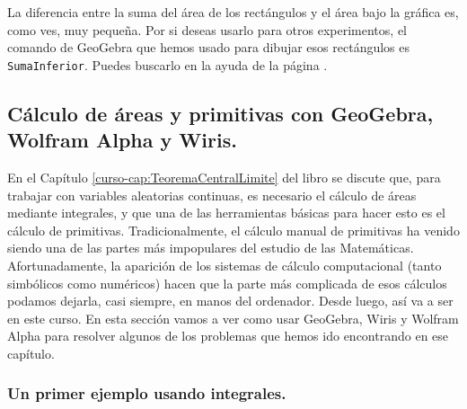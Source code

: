 \documentclass[10pt,a4paper]{article}\usepackage[]{graphicx}\usepackage[]{color}
\newcounter{cont01}
\begin{document}
La diferencia entre la suma del área de los rectángulos y el área bajo la gráfica es, como ves, muy pequeña. Por si deseas usarlo para otros experimentos, el comando de GeoGebra que hemos usado para dibujar esos rectángulos es {\tt SumaInferior}. Puedes buscarlo en la ayuda de la página .

\subsection{Cálculo de áreas y primitivas con GeoGebra, Wolfram Alpha y Wiris.}
\label{tut05:subsec:IntegralesSumaAreasRectangulos}

En el Capítulo \ref{curso-cap:TeoremaCentralLimite} del libro se discute que, para trabajar con variables aleatorias continuas, es necesario el cálculo de áreas mediante integrales, y que una de las herramientas básicas para hacer esto es el cálculo de primitivas. Tradicionalmente, el cálculo manual de primitivas ha venido siendo una de las partes más impopulares del estudio de las Matemáticas. Afortunadamente, la aparición de los sistemas de cálculo computacional (tanto simbólicos como numéricos) hacen que la parte más complicada de esos cálculos podamos dejarla, casi siempre, en manos del ordenador. Desde luego, así va a ser en este curso. En esta sección vamos a ver como usar GeoGebra, Wiris y Wolfram Alpha para resolver algunos de los problemas que hemos ido encontrando en ese capítulo.

\subsubsection{Un primer ejemplo usando integrales.}
\label{tut05:subsubsec:UnPrimerEjemploUsoIntegrales}
\end{document}
